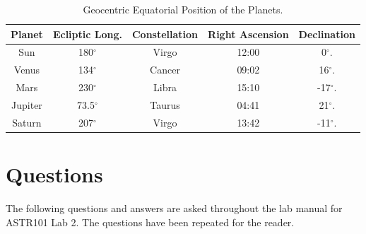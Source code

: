 \documentclass{article}
\begin{document}
\begin{table}[h!]
\begin{center}
\begin{tabular}{| c | c | c | c | c | }
\hline
Planet & Ecliptic Long. & Constellation & Right Ascension & Declination\\
\hline
\hline
Sun & 180$^\circ$ & Virgo & 12:00 & 0$^\circ$. \\
Venus & 134$^\circ$ & Cancer & 09:02 & 16$^\circ$. \\
Mars & 230$^\circ$ & Libra & 15:10 & -17$^\circ$. \\
Jupiter & 73.5$^\circ$ & Taurus & 04:41 & 21$^\circ$. \\
Saturn & 207$^\circ$ & Virgo & 13:42 & -11$^\circ$. \\
\hline
\end{tabular}
\end{center}
\caption{Geocentric Equatorial Position of the Planets.\label{tab:pos}}
\end{table}


\section{Questions}
\label{sec:qna}

The following questions and answers are asked throughout the lab manual for ASTR101 Lab 2. The
questions have been repeated for the reader.
\end{document}
